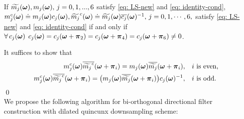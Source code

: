 \begin{proposition}\label{prop: mc}
If $\widetilde{m_{j}}(\boldsymbol{\omega}), m_j(\boldsymbol{\omega}),\,  j = 0,1,...,6$ satisfy \eqref{eq: LS-new} and \eqref{eq: identity-cond}, 
$m_j^c(\boldsymbol{\omega})\doteq m_j(\boldsymbol{\omega})c_j(\boldsymbol{\omega}), \widetilde{m_j}^c(\boldsymbol{\omega})\doteq \widetilde{m_{j}}(\boldsymbol{\omega})\overline{c_j}(\boldsymbol{\omega})^{-1},\, j = 0,1,\cdots,6,$
satisfy \eqref{eq: LS-new} and \eqref{eq: identity-cond} if and only if $\forall\, c_j(\boldsymbol{\omega})\,\; c_j(\boldsymbol{\omega}) = c_j(\boldsymbol{\omega}+\boldsymbol{\pi}_2)=c_j(\boldsymbol{\omega}+\boldsymbol{\pi}_4) = c_j(\boldsymbol{\omega}+\boldsymbol{\pi}_6) \neq 0$.
\end{proposition}
It suffices to show that
\begin{align*}
m_j^c(\boldsymbol{\omega})\overline{\widetilde{m_j}^c}(\boldsymbol{\omega} + \boldsymbol{\pi}_i) = m_j(\boldsymbol{\omega})\overline{\widetilde{m_{j}}}(\boldsymbol{\omega} + \boldsymbol{\pi}_{i}),\quad & i \text{ is even,}\\
m_j^c(\boldsymbol{\omega})\overline{\widetilde{m_j}^c}(\boldsymbol{\omega} + \boldsymbol{\pi}_i) = \big(m_j(\boldsymbol{\omega})\overline{\widetilde{m_{j}}}(\boldsymbol{\omega} + \boldsymbol{\pi}_{i})\big)c_j(\boldsymbol{\omega})^{-1},\quad & i \text{ is odd.}
\end{align*}
\qed\\
We propose the following algorithm for bi-orthogonal directional filter construction with dilated quincunx downsampling scheme:
